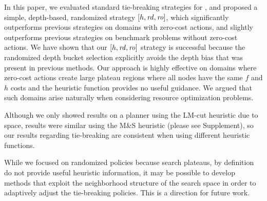 In this paper, we evaluated standard tie-breaking
strategies for \astar, and proposed a simple,
depth-based, randomized strategy $[h,\mbox{\textit{rd}},\mbox{\textit{ro}}]$, which 
significantly outperforms previous strategies on domains with zero-cost actions, 
and slightly outperforms previous strategies on benchmark problems without zero-cost actions.
We have shown that our $[h,\mbox{\textit{rd}},\mbox{\textit{ro}}]$ strategy is successful because the randomized depth bucket selection explicitly avoids the depth bias that was present 
in previous methods. 
Our approach is highly effective on domains where zero-cost actions create large plateau regions where all nodes have the same $f$ and $h$ costs
and the heuristic function provides no useful guidance.
We argued that such domains arise naturally when considering resource optimization problems.


Although we only showed results on a planner using the LM-cut heuristic due to space, 
results were similar using the M\&S heuristic  (please see Supplement), so our results regarding tie-breaking are consistent when using different heuristic functions.




While we focused on randomized policies because search plateaus, by definition do not provide useful heuristic information,
it may be possible to develop methods that exploit the neighborhood structure of the search space
in order to adaptively adjust the tie-breaking policies. This is a direction for future work.




